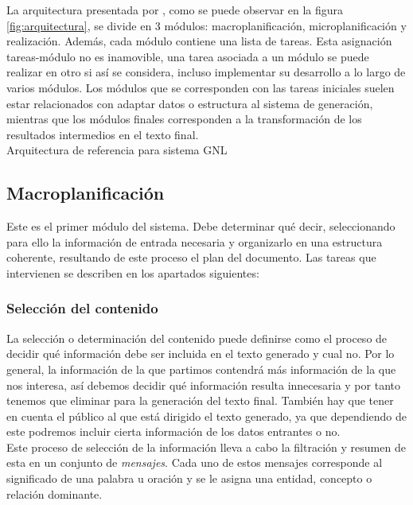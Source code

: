 La arquitectura presentada por \cite{reiter1997building}, como se puede observar en la figura \ref{fig:arquitectura}, se divide en 3 módulos: macroplanificación, microplanificación y realización. Además, cada módulo contiene una lista de tareas. Esta asignación tareas-módulo no es inamovible, una tarea asociada a un módulo se puede realizar en otro si así se considera, incluso implementar su desarrollo a lo largo de varios módulos. Los módulos que se corresponden con las tareas iniciales suelen estar relacionados con adaptar datos o estructura al sistema de generación, mientras que los módulos finales corresponden a la transformación de los resultados intermedios en el texto final.\\

%
{Arquitectura de referencia para sistema GNL \citep{vicente2015generacion}}

\subsection{Macroplanificación}
Este es el primer módulo del sistema. Debe determinar qué decir, seleccionando para ello la información de entrada necesaria y organizarlo en una estructura coherente, resultando de este proceso el plan del documento. Las tareas que intervienen se describen en los apartados siguientes: \\

\subsubsection{Selección del contenido}
La selección o determinación del contenido puede definirse como el proceso de decidir qué información debe ser incluida en el texto generado y cual no. Por lo general, la información de la que partimos contendrá más información de la que nos interesa, así debemos decidir qué información resulta innecesaria y por tanto tenemos que eliminar para la generación del texto final. También hay que tener en cuenta el público al que está dirigido el texto generado, ya que dependiendo de este podremos incluir cierta información de los datos entrantes o no.\\

Este proceso de selección de la información lleva a cabo la filtración y resumen de esta en un conjunto de \textit{mensajes}. Cada uno de estos mensajes corresponde al significado de una palabra u oración y se le asigna una entidad, concepto o relación dominante.\\

